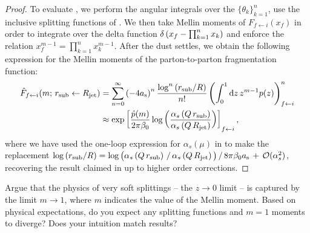 \begin{proof}
To evaluate , we perform the angular integrals over the \(\{\theta_k\}_{k = 1}^n\), use the inclusive splitting functions of .
%
We then take Mellin moments of \(F_{f\leftarrow i}(x_f)\) in order to integrate over the delta function \(\delta \left(x_f - \prod_{k=1}^n x_k\right)\) and enforce the relation \(x_f^{m-1} = \prod_{k=1}^n x_k^{m-1}\).
%
After the dust settles, we obtain the following expression for the Mellin moments of the parton-to-parton fragmentation function:
\begin{subequations}
\label{eq:ll_fragmentation_repeat}
\begin{align}
    \hat{F}_{f \leftarrow i}(m;\,r_\text{sub} \leftarrow R_\text{jet})
    &=
    \sum_{n=0}^\infty
    \left(-4a_{\mathrm{s}}\right)^n
    \frac{\log^n\left(r_\text{sub}/R\right)}{n!}
    \left(
        \int_0^1 \dd z\,
        z^{m-1} p(z)
    \right)^n_{f\leftarrow i}
    \\
    &\approx
    \exp\left[
        \frac{\hat{p}(m)}{2\pi\beta_0}
        \log\left(
        \frac{
            \alpha_s\left(Q\,r_\text{sub}\right)
        }{
            \alpha_s\left(Q\,R_\text{jet}\right)
        }\right)
    \right]_{f \leftarrow i}
    ,
\end{align}
\end{subequations}
where we have used the one-loop expression for \(\alpha_s(\mu)\) in  to make the replacement \(
    \log\left(r_\text{sub}/R\right)
    =
    \log\big(
        \alpha_s\left(Q\,r_\text{sub}\right)
        \,/\,
        \alpha_s\left(Q\,R_\text{jet}\right)
    \big)
    \,/\,
    8\pi\beta_0a_{\mathrm{s}}
    \,
    +
    \,
    \mathcal{O}(\alpha_s^2)
\), recovering the result claimed in  up to higher order corrections.
%
\end{proof}


\begin{exercise}
    Argue that the physics of very soft splittings -- the \(z \to 0\) limit -- is captured by the limit \(m \to 1\), where \(m\) indicates the value of the Mellin moment.
    Based on physical expectations, do you expect any splitting functions and \(m=1\) moments to diverge?
    Does your intuition match results?
\end{exercise}




